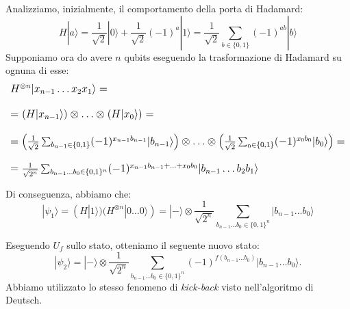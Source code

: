 Analizziamo, inizialmente, il comportamento della porta di Hadamard:
\begin{equation*}
    H|a\rangle = \frac{1}{\sqrt{2}}|0\rangle + \frac{1}{\sqrt{2}}(-1)^a|1\rangle = \frac{1}{\sqrt{2}} \sum_{b \in \{0,1\}} (-1)^{ab}|b\rangle
\end{equation*}
Supponiamo ora do avere $n$ qubits eseguendo la trasformazione di Hadamard su ognuna di esse:
\begin{equation*}
\large
        \begin{array}{l}
            H^{\otimes n}|x_{n-1}\hdots x_2 x_1\rangle = \\ \\
            = \left(H|x_{n-1}\rangle\right) \otimes \hdots \otimes \left(H|x_{0}\rangle\right) = \\ \\
            = \left(\frac{1}{\sqrt{2}} \sum_{b_{n-1} \in \{0,1\}} (-1)^{x_{n-1}b_{n-1}}|b_{n-1}\rangle\right) \otimes \hdots \otimes \left(\frac{1}{\sqrt{2}} \sum_{_0 \in \{0,1\}} (-1)^{x_{0}b_0}|b_0\rangle\right) = \\ \\
            = \frac{1}{\sqrt{2^n}} \sum_{b_{n-1} \hdots b_0 \in \{0,1\}^n} (-1)^{x_{n-1}b_{n-1} + \hdots + x_{0}b_{0}} |b_{n-1}\hdots b_2 b_1\rangle
        \end{array}
\end{equation*}

Di conseguenza, abbiamo che:
\begin{equation*}
    |\psi_1\rangle = (H|1\rangle)(H^{\otimes n}|0 \hdots 0\rangle) = |-\rangle \otimes \frac{1}{\sqrt{2^n}}\sum_{b_{n-1} \hdots b_0 \in \{0,1\}^n} |b_{n-1} \hdots b_0\rangle
\end{equation*}

Eseguendo $U_f$ sullo stato, otteniamo il seguente nuovo stato:
\begin{equation*}
    |\psi_2\rangle = |-\rangle \otimes \frac{1}{\sqrt{2^n}}\sum_{b_{n-1}\hdots b_0 \in \{0,1\}^n} (-1)^{f(b_{n-1} \hdots b_0)}|b_{n-1} \hdots b_0\rangle.
\end{equation*}
Abbiamo utilizzato lo stesso fenomeno di \textit{kick-back} visto nell'algoritmo
di Deutsch.

